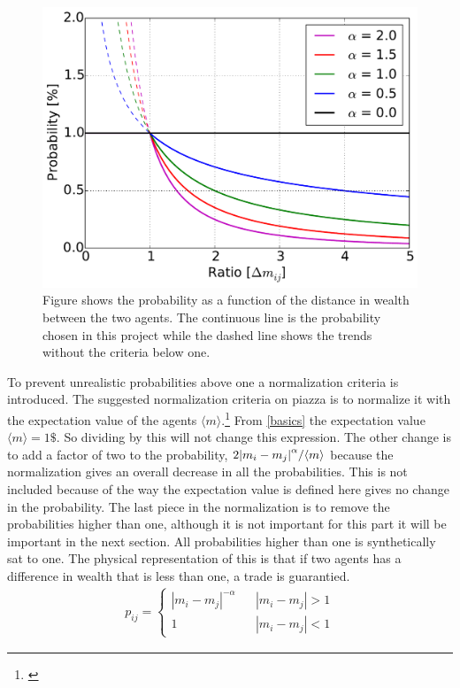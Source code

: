 \begin{figure}
\centering
\includegraphics[width=0.7\linewidth]{theory/bilder/difference}
\caption{Figure shows the probability as a function of the distance in wealth between the two agents. The continuous line is the probability chosen in this project while the dashed line shows the trends without the criteria below one.}
\label{fig:difference}
\end{figure}


To prevent unrealistic probabilities above one a normalization criteria is introduced. The suggested normalization criteria on piazza is to normalize it with the expectation value of the agents $\langle m\rangle$.\footnote{\href{https://piazza.com/class/j6owewp05ym46p?cid=126}{\color{blue}{Piazza: Morten's suggestion} }} From \ref{basics} the expectation value $\langle m\rangle=1\$$. So dividing by this will not change this expression. The other change is to add a factor of two to the probability, $2\abs{m_i-m_j}^\alpha/\langle m\rangle$ because the normalization gives an overall decrease in all the probabilities. This is not included because of the way the expectation value is defined here gives no change in the probability. The last piece in the normalization is to remove the probabilities higher than one, although it is not important for this part it will be important in the next section. All probabilities higher than one is synthetically sat to one. The physical representation of this is that if two agents has a difference in wealth that is less than one, a trade is guarantied.\\

\begin{align} 
p_{ij}=
\left\{\begin{matrix}
|m_i-m_j|^{-\alpha} && |m_i-m_j|>1 \\ 
1 &&|m_i-m_j|<1
\end{matrix}\right.\label{eq:EPICPROB1}
\end{align}

